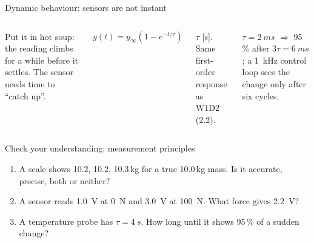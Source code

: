 \documentclass[aspectratio=169,10pt]{beamer}
\begin{document}
\begin{frame}{Dynamic behaviour: sensors are not instant}
\begin{columns}[T]
\centering
{}
\begin{defbox}
\small Put it in hot soup: the reading climbs for a while before it settles. The sensor needs time to ``catch up''.
\end{defbox}
\begin{eqbox}
\vspace{-2mm}
\[ y(t)=y_\infty\left(1-e^{-t/\tau}\right) \]
\vspace{-4mm}
\end{eqbox}
{\footnotesize $\tau$  [s]. Same first-order response as W1D2 (2.2).}
\begin{keybox}[Example]
\small $\tau=\SI{2}{ms}$ $\Rightarrow$ 95\,\% after $3\tau=\SI{6}{ms}$; a \SI{1}{kHz} control loop sees the change only after six cycles.
\end{keybox}
\end{columns}
\end{frame}

\begin{frame}{Check your understanding: measurement principles}
\begin{keybox}
\large
\begin{enumerate}
\item A scale shows 10.2, 10.2, 10.3\,kg for a true 10.0\,kg mass. Is it accurate, precise, both or neither?
\item A sensor reads \SI{1.0}{V} at \SI{0}{N} and \SI{3.0}{V} at \SI{100}{N}. What force gives \SI{2.2}{V}?
\item A temperature probe has $\tau=\SI{4}{s}$. How long until it shows 95\,\% of a sudden change?
\end{enumerate}
\end{keybox}
\end{frame}
\end{document}
